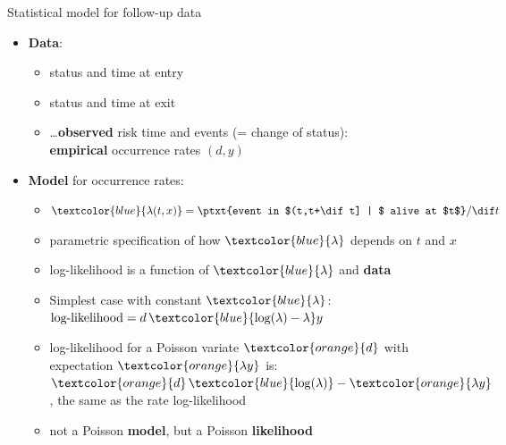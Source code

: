 \begin{frame}{Statistical model for follow-up data}
  \begin{itemize}
  \item \textbf{Data}:

    \begin{itemize}
    \item status and time at entry
    \item status and time at exit
    \item \ldots \textbf{observed} risk time and events (= change of status):\\
        \textbf{empirical} occurrence rates $(d, y)$
    \end{itemize}
    
  \item \textbf{Model} for occurrence rates:

    \begin{itemize}
    \item $\textcolor{blue}{\lambda(t, x)}
          = \ptxt{event in $(t,t+\dif t] | $ alive at $t$} / \dif t$
    \item parametric specification of how $\textcolor{blue}{\lambda}$ depends on $t$ and $x$
    \item log-likelihood is a function of $\textcolor{blue}{\lambda}$ and
      \textbf{data}
    \item Simplest case with constant $\textcolor{blue}{\lambda}$:
          $\text{log-likelihood} = d\,\textcolor{blue}{\log(\lambda) - \lambda}y$
    \item log-likelihood for a Poisson variate $\textcolor{orange}{d}$ with expectation
  $\textcolor{orange}{\lambda y}$ is:\\ 
  $\textcolor{orange}{d}\,\textcolor{blue}{\log(\lambda)} - \textcolor{orange}{\lambda y}$,
  the same as the rate log-likelihood
\item not a Poisson \textbf{model}, but a Poisson \textbf{likelihood}
  \end{itemize}
  
  \end{itemize}
\end{frame}


